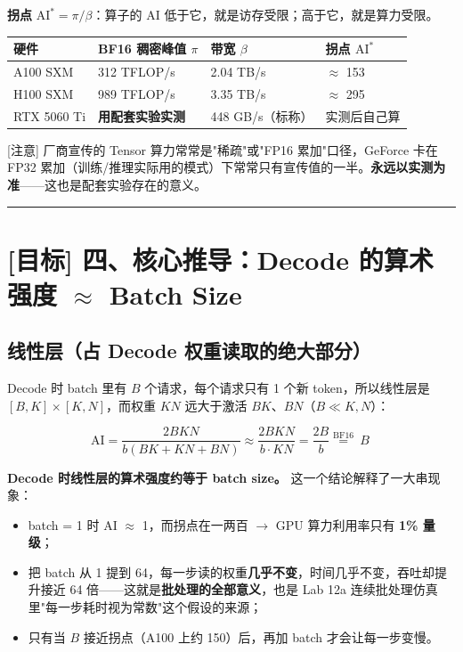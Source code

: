 \textbf{拐点} $\text{AI}^* = \pi / \beta$：算子的 AI 低于它，就是访存受限；高于它，就是算力受限。

\begin{center}
\small
\begin{tabularx}{\textwidth}{p{2.5cm} p{3.5cm} X X}
\toprule
\textbf{硬件} & \textbf{BF16 稠密峰值 $\pi$} & \textbf{带宽 $\beta$} & \textbf{拐点 $\text{AI}^*$} \\
\midrule
A100 SXM & 312 TFLOP/s & 2.04 TB/s & $\approx$ 153 \\
H100 SXM & 989 TFLOP/s & 3.35 TB/s & $\approx$ 295 \\
RTX 5060 Ti & \textbf{用配套实验实测} & 448 GB/s（标称） & 实测后自己算 \\
\bottomrule
\end{tabularx}
\end{center}

\begin{warningBox}[避坑指南与核心警示]
{}[注意] 厂商宣传的 Tensor 算力常常是"稀疏"或"FP16 累加"口径，GeForce 卡在 FP32 累加（训练/推理实际用的模式）下常常只有宣传值的一半。\textbf{永远以实测为准}——这也是配套实验存在的意义。
\end{warningBox}

\vspace{0.8em}\hrule\vspace{0.8em}

\section{[目标] 四、核心推导：Decode 的算术强度 \texorpdfstring{$\approx$}{≈} Batch Size}

\subsection{线性层（占 Decode 权重读取的绝大部分）}

Decode 时 batch 里有 $B$ 个请求，每个请求只有 1 个新 token，所以线性层是 $[B, K] \times [K, N]$，而权重 $KN$ 远大于激活 $BK$、$BN$（$B \ll K, N$）：

\[
\text{AI} = \frac{2BKN}{b(BK + KN + BN)} \approx \frac{2BKN}{b \cdot KN} = \frac{2B}{b} \overset{\text{BF16}}{=} \boxed{\ B\ }
\]

\textbf{Decode 时线性层的算术强度约等于 batch size。} 这一个结论解释了一大串现象：
\begin{itemize}
  \item batch = 1 时 AI $\approx$ 1，而拐点在一两百 $\rightarrow$ GPU 算力利用率只有 \textbf{1\% 量级}；
  \item 把 batch 从 1 提到 64，每一步读的权重\textbf{几乎不变}，时间几乎不变，吞吐却提升接近 64 倍——这就是\textbf{批处理的全部意义}，也是 Lab 12a 连续批处理仿真里"每一步耗时视为常数"这个假设的来源；
  \item 只有当 $B$ 接近拐点（A100 上约 150）后，再加 batch 才会让每一步变慢。
\end{itemize}

